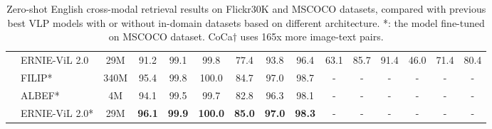 \documentclass{article}
\begin{document}
\begin{table*}[]
{\begin{tabular}{@{}llccccccccccccc@{}}
\multicolumn{1}{c}{}                    & \multicolumn{1}{l|}{ERNIE-ViL 2.0}      & \multicolumn{1}{c|}{29M}      & {91.2} & {99.1} & \multicolumn{1}{c|}{{99.8}} & { 77.4} & {93.8} & \multicolumn{1}{c|}{{96.4}} & {63.1} & {85.7} & \multicolumn{1}{c|}{{91.4}} & {46.0} & {71.4} & {80.4} \\ \cmidrule(l){2-15} 
\multicolumn{1}{c}{}                    & \multicolumn{1}{l|}{FILIP*}      & \multicolumn{1}{c|}{340M}     & 95.4          & 99.8           & \multicolumn{1}{c|}{100.0}          & 84.7          & 97.0          & \multicolumn{1}{c|}{98.7}          & -             & -             & \multicolumn{1}{c|}{-}             & -                   & -             & -             \\
\multicolumn{1}{c}{}                    & \multicolumn{1}{l|}{ALBEF*}      & \multicolumn{1}{c|}{4M}       & 94.1          & 99.5           & \multicolumn{1}{c|}{99.7}           & 82.8          & 96.3          & \multicolumn{1}{c|}{98.1}          & -             & -             & \multicolumn{1}{c|}{-}             & -                   & -             & -             \\
\multicolumn{1}{c}{}                    & \multicolumn{1}{l|}{ERNIE-ViL 2.0*}     & \multicolumn{1}{c|}{29M}      & \textbf{96.1} & \textbf{99.9}  & \multicolumn{1}{c|}{\textbf{100.0}} & \textbf{85.0} & \textbf{97.0} & \multicolumn{1}{c|}{\textbf{98.3}} & -             & -             & \multicolumn{1}{c|}{-}             & -                   & -             & -            
     \\ \bottomrule
\end{tabular}
}
\caption{ Zero-shot English cross-modal retrieval results on Flickr30K and MSCOCO datasets, compared with previous best VLP models with or without in-domain datasets based on different architecture. *: the model fine-tuned on MSCOCO dataset. CoCa$\dagger$ uses 165x more image-text pairs.}
\label{table:crossretrieval_zero-shot}
\end{table*}
\end{document}
